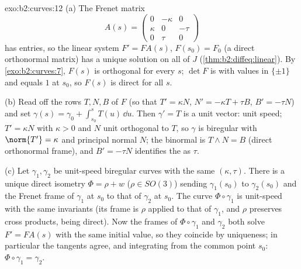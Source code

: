 \begin{solution}{exo:b2:curves:12}
(a) The Frenet matrix
\[
A(s) = \begin{pmatrix} 0 & -\kappa & 0\\ \kappa & 0 & -\tau\\
0 & \tau & 0\end{pmatrix}
\]
has  entries, so the linear system $F' = FA(s)$,
$F(s_0) = F_0$ (a direct orthonormal matrix) has a unique
solution on all of $J$ (\cref{thm:b2:diffeq:linear}). By
\cref{exo:b2:curves:7}, $F(s)$ is orthogonal for every $s$;
$\det F$ is  with values in $\{\pm1\}$ and equals
$1$ at $s_0$, so $F(s)$ is direct for all $s$.

(b) Read off the rows $T, N, B$ of $F$ (so that $T' = \kappa
N$, $N' = -\kappa T + \tau B$, $B' = -\tau N$) and set
$\gamma(s) = \gamma_0 + \int_{s_0}^s T(u)\,\dd u$. Then
$\gamma' = T$ is a unit vector: unit speed; $T' = \kappa N$
with $\kappa > 0$ and $N$ unit orthogonal to $T$, so $\gamma$
is biregular with  $\norm{T'} = \kappa$ and
principal normal $N$; the binormal is $T \wedge N = B$
(direct orthonormal frame), and $B' = -\tau N$ identifies the
 as $\tau$.

(c) Let $\gamma_1, \gamma_2$ be unit-speed biregular curves
with the same $(\kappa, \tau)$. There is a unique direct
isometry $\Phi = \rho + w$ ($\rho \in SO(3)$) sending
$\gamma_1(s_0)$ to $\gamma_2(s_0)$ and the Frenet frame of
$\gamma_1$ at $s_0$ to that of $\gamma_2$ at $s_0$. The curve
$\Phi\circ\gamma_1$ is unit-speed with the same invariants
(its frame is $\rho$ applied to that of $\gamma_1$, and
$\rho$ preserves cross products, being direct). Now the
frames of $\Phi\circ\gamma_1$ and $\gamma_2$ both solve $F' =
FA(s)$ with the same initial value, so they coincide by
uniqueness; in particular the tangents agree, and integrating
from the common point $s_0$: $\Phi\circ\gamma_1 = \gamma_2$.
\end{solution}

